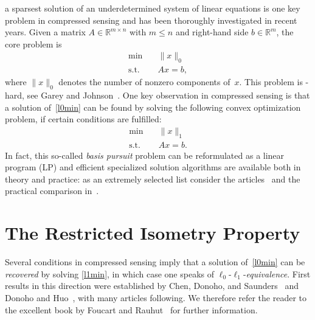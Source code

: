 \documentclass[journal]{IEEEtran}
\newcommand{\Norm}[2]{\lVert{#1}\rVert_{#2}}
\newcommand{\R}{\mathds{R}}
\newcommand{\NP}{\text{NP}}
\begin{document}
 a sparsest solution of an underdetermined system of linear
equations is one key problem in compressed sensing and has been
thoroughly investigated in recent years. Given a matrix $A \in \R^{m \times n}$ with $m \leq n$ and 
right-hand side $b \in \R^m$, the core problem is
\begin{align}\label{l0min}
 \min \quad & \Norm{x}{0} \tag{$P_0$}\\
 \text{s.t.} \quad & Ax = b, \nonumber
\end{align}
where $\Norm{x}{0}$ denotes the number of nonzero components of~$x$. This
problem is \NP-hard, see Garey and
Johnson~\cite{GareyJohnson}. One key observation in compressed sensing is
that a solution of~\eqref{l0min} can be found by solving the following
convex optimization problem, if certain conditions are fulfilled:
\begin{align}\label{l1min}
 \min \quad & \Norm{x}{1} \tag{$P_1$}\\
 \text{s.t.} \quad & Ax = b. \nonumber
\end{align}
In fact, this so-called \emph{basis pursuit} problem can be reformulated as
a linear program (LP) and efficient specialized solution algorithms are
available both in theory and practice: as an extremely selected list
consider the articles~\cite{BecBC11,CheDS99,OsbPT00,vdBF08} and the
practical comparison in~\cite{LorPT15}.

%

\section{The Restricted Isometry Property}
\label{sec:RIP}

\noindent
Several conditions in compressed sensing imply that a solution
of~\eqref{l0min} can be \emph{recovered} by solving \eqref{l1min}, in which
case one speaks of $\ell_0$-$\ell_1$-\emph{equivalence}. First results in
this direction were established by Chen, Donoho, and
Saunders~\cite{CheDS99} and Donoho and Huo~\cite{DH01}, with many articles
following. We therefore refer the reader to the excellent book by Foucart
and Rauhut~\cite{FouR13} for further information.
\end{document}
